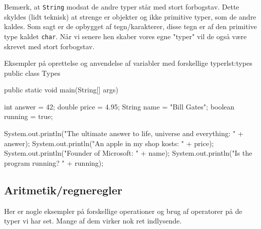 \begin{remark}
	Bemærk, at \texttt{String} modsat de andre typer står med stort forbogstav. Dette skyldes (lidt teknisk) at strenge er objekter og ikke primitive typer, som de andre kaldes. Som sagt er de opbygget af tegn/karakterer, disse tegn er af den primitive type kaldet \texttt{char}. Når vi senere hen skaber vores egne "typer" vil de også være skrevet med stort forbogstav.
\end{remark}

\begin{JavaCode}{Eksempler på oprettelse og anvendelse af variabler med forskellige typer}{lst:types}
public class Types {
	public static void main(String[] args) {
		int answer = 42;
		double price = 4.95;
		String name = "Bill Gates";
		boolean running = true;
		
		System.out.println("The ultimate answer to life, universe and everything: " + answer);
		System.out.println("An apple in my shop kosts: " + price);
		System.out.println("Founder of Microsoft: " + name);
		System.out.println("Is the program running? " + running);
	}
}
\end{JavaCode}

\subsection{Aritmetik/regneregler}
Her er nogle eksempler på forskellige operationer og brug af operatorer på de typer vi har set. Mange af dem virker nok ret indlysende.

